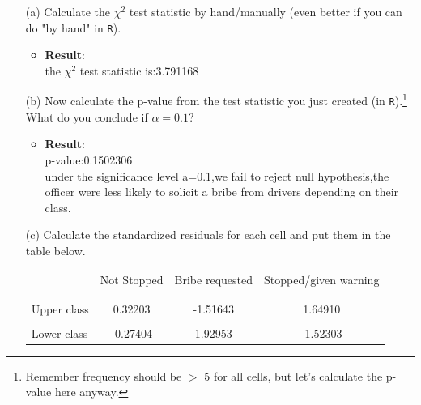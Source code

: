 \documentclass[12pt,letterpaper]{article}
\begin{document}
\begin{enumerate}
	
	\item [(a)]
	Calculate the $\chi^2$ test statistic by hand/manually (even better if you can do "by hand" in \texttt{R}).\\
	
    \begin{itemize}
    \item \textbf{Result}:\\
    the $\chi^2$ test statistic is:3.791168
    \end{itemize}

	
	\item [(b)]
	Now calculate the p-value from the test statistic you just created (in \texttt{R}).\footnote{Remember frequency should be $>$ 5 for all cells, but let's calculate the p-value here anyway.}  What do you conclude if $\alpha = 0.1$?\\
		
	\begin{itemize}
		\item \textbf{Result}:\\
		p-value:0.1502306\\
		under the significance level a=0.1,we fail to reject null hypothesis,the officer were less likely to solicit a bribe from drivers depending on their class.
	\end{itemize}
	
	\item [(c)] Calculate the standardized residuals for each cell and put them in the table below.
	\vspace{1cm}
		
	\begin{table}[h]
		\centering
		\begin{tabular}{l | c c c }
			& Not Stopped & Bribe requested & Stopped/given warning \\
			\\[-1.8ex] 
			\hline \\[-1.8ex]
			Upper class  &0.32203 &-1.51643 &  1.64910 \\
			\\
			Lower class &-0.27404 &1.92953 & -1.52303 \\
			
		\end{tabular}
	\end{table}
	

\end{enumerate}
\end{document}
